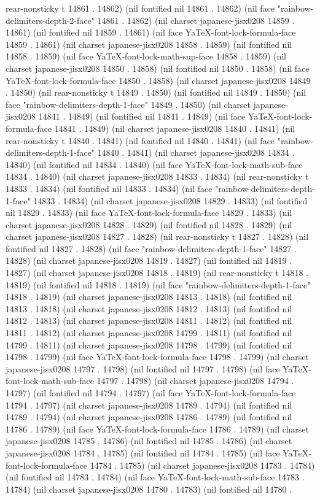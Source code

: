 rear-nonsticky t 14861 . 14862) (nil fontified nil 14861 . 14862) (nil face "rainbow-delimiters-depth-2-face" 14861 . 14862) (nil charset japanese-jisx0208 14859 . 14861) (nil fontified nil 14859 . 14861) (nil face YaTeX-font-lock-formula-face 14859 . 14861) (nil charset japanese-jisx0208 14858 . 14859) (nil fontified nil 14858 . 14859) (nil face YaTeX-font-lock-math-sup-face 14858 . 14859) (nil charset japanese-jisx0208 14850 . 14858) (nil fontified nil 14850 . 14858) (nil face YaTeX-font-lock-formula-face 14850 . 14858) (nil charset japanese-jisx0208 14849 . 14850) (nil rear-nonsticky t 14849 . 14850) (nil fontified nil 14849 . 14850) (nil face "rainbow-delimiters-depth-1-face" 14849 . 14850) (nil charset japanese-jisx0208 14841 . 14849) (nil fontified nil 14841 . 14849) (nil face YaTeX-font-lock-formula-face 14841 . 14849) (nil charset japanese-jisx0208 14840 . 14841) (nil rear-nonsticky t 14840 . 14841) (nil fontified nil 14840 . 14841) (nil face "rainbow-delimiters-depth-1-face" 14840 . 14841) (nil charset japanese-jisx0208 14834 . 14840) (nil fontified nil 14834 . 14840) (nil face YaTeX-font-lock-math-sub-face 14834 . 14840) (nil charset japanese-jisx0208 14833 . 14834) (nil rear-nonsticky t 14833 . 14834) (nil fontified nil 14833 . 14834) (nil face "rainbow-delimiters-depth-1-face" 14833 . 14834) (nil charset japanese-jisx0208 14829 . 14833) (nil fontified nil 14829 . 14833) (nil face YaTeX-font-lock-formula-face 14829 . 14833) (nil charset japanese-jisx0208 14828 . 14829) (nil fontified nil 14828 . 14829) (nil charset japanese-jisx0208 14827 . 14828) (nil rear-nonsticky t 14827 . 14828) (nil fontified nil 14827 . 14828) (nil face "rainbow-delimiters-depth-1-face" 14827 . 14828) (nil charset japanese-jisx0208 14819 . 14827) (nil fontified nil 14819 . 14827) (nil charset japanese-jisx0208 14818 . 14819) (nil rear-nonsticky t 14818 . 14819) (nil fontified nil 14818 . 14819) (nil face "rainbow-delimiters-depth-1-face" 14818 . 14819) (nil charset japanese-jisx0208 14813 . 14818) (nil fontified nil 14813 . 14818) (nil charset japanese-jisx0208 14812 . 14813) (nil fontified nil 14812 . 14813) (nil charset japanese-jisx0208 14811 . 14812) (nil fontified nil 14811 . 14812) (nil charset japanese-jisx0208 14799 . 14811) (nil fontified nil 14799 . 14811) (nil charset japanese-jisx0208 14798 . 14799) (nil fontified nil 14798 . 14799) (nil face YaTeX-font-lock-formula-face 14798 . 14799) (nil charset japanese-jisx0208 14797 . 14798) (nil fontified nil 14797 . 14798) (nil face YaTeX-font-lock-math-sub-face 14797 . 14798) (nil charset japanese-jisx0208 14794 . 14797) (nil fontified nil 14794 . 14797) (nil face YaTeX-font-lock-formula-face 14794 . 14797) (nil charset japanese-jisx0208 14789 . 14794) (nil fontified nil 14789 . 14794) (nil charset japanese-jisx0208 14786 . 14789) (nil fontified nil 14786 . 14789) (nil face YaTeX-font-lock-formula-face 14786 . 14789) (nil charset japanese-jisx0208 14785 . 14786) (nil fontified nil 14785 . 14786) (nil charset japanese-jisx0208 14784 . 14785) (nil fontified nil 14784 . 14785) (nil face YaTeX-font-lock-formula-face 14784 . 14785) (nil charset japanese-jisx0208 14783 . 14784) (nil fontified nil 14783 . 14784) (nil face YaTeX-font-lock-math-sub-face 14783 . 14784) (nil charset japanese-jisx0208 14780 . 14783) (nil fontified nil 14780 . 